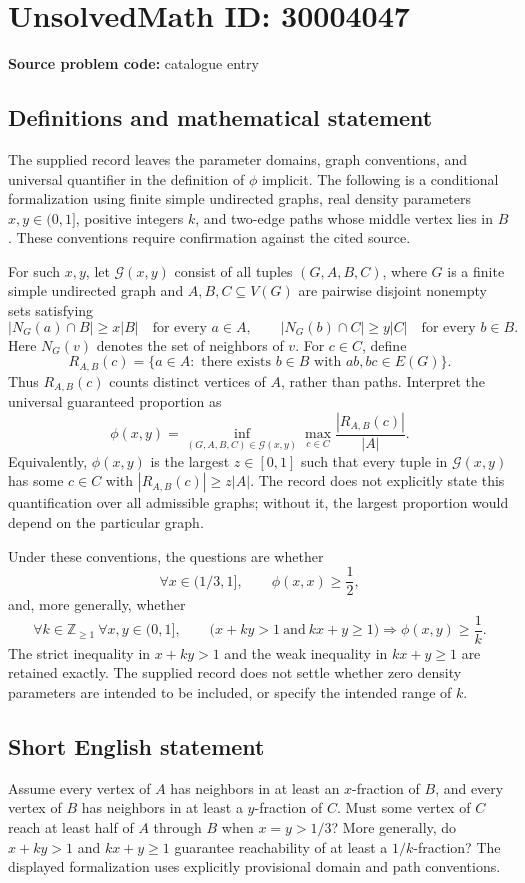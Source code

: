 \documentclass[11pt]{article}
\begin{document}
\section*{UnsolvedMath ID: 30004047}
\textbf{Source problem code:} catalogue entry
\subsection{Definitions and mathematical statement}
The supplied record leaves the parameter domains, graph conventions, and universal quantifier in the definition of \(\phi\) implicit. The following is a conditional formalization using finite simple undirected graphs, real density parameters \(x,y\in(0,1]\), positive integers \(k\), and two-edge paths whose middle vertex lies in \(B\). These conventions require confirmation against the cited source.

For such \(x,y\), let \(\mathcal G(x,y)\) consist of all tuples \((G,A,B,C)\), where \(G\) is a finite simple undirected graph and \(A,B,C\subseteq V(G)\) are pairwise disjoint nonempty sets satisfying
\[
 |N_G(a)\cap B|\ge x|B|\quad\text{for every }a\in A,
 \qquad
 |N_G(b)\cap C|\ge y|C|\quad\text{for every }b\in B.
\]
Here \(N_G(v)\) denotes the set of neighbors of \(v\). For \(c\in C\), define
\[
 R_{A,B}(c)=\{a\in A:\text{ there exists }b\in B\text{ with }ab,bc\in E(G)\}.
\]
Thus \(R_{A,B}(c)\) counts distinct vertices of \(A\), rather than paths. Interpret the universal guaranteed proportion as
\[
 \phi(x,y)=\inf_{(G,A,B,C)\in\mathcal G(x,y)}
 \max_{c\in C}\frac{|R_{A,B}(c)|}{|A|}.
\]
Equivalently, \(\phi(x,y)\) is the largest \(z\in[0,1]\) such that every tuple in \(\mathcal G(x,y)\) has some \(c\in C\) with \(|R_{A,B}(c)|\ge z|A|\). The record does not explicitly state this quantification over all admissible graphs; without it, the largest proportion would depend on the particular graph.

Under these conventions, the questions are whether
\[
 \forall x\in(1/3,1],\qquad \phi(x,x)\ge\frac12,
\]
and, more generally, whether
\[
 \forall k\in\mathbb Z_{\ge1}\ \forall x,y\in(0,1],\qquad
 \bigl(x+ky>1\ \text{and}\ kx+y\ge1\bigr)
 \Longrightarrow \phi(x,y)\ge\frac1k.
\]
The strict inequality in \(x+ky>1\) and the weak inequality in \(kx+y\ge1\) are retained exactly. The supplied record does not settle whether zero density parameters are intended to be included, or specify the intended range of \(k\).
\subsection{Short English statement}
Assume every vertex of \(A\) has neighbors in at least an \(x\)-fraction of \(B\), and every vertex of \(B\) has neighbors in at least a \(y\)-fraction of \(C\). Must some vertex of \(C\) reach at least half of \(A\) through \(B\) when \(x=y>1/3\)? More generally, do \(x+ky>1\) and \(kx+y\ge1\) guarantee reachability of at least a \(1/k\)-fraction? The displayed formalization uses explicitly provisional domain and path conventions.
\end{document}
